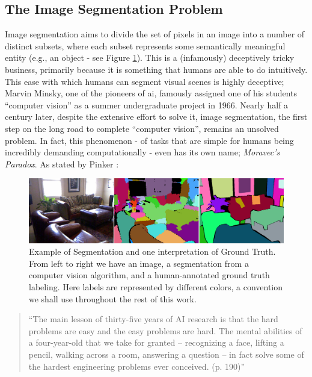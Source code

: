 \subsection{The Image Segmentation Problem}
Image segmentation aims to divide the set of pixels in an image into a number of distinct subsets, where each subset represents some semantically meaningful entity (e.g., an object - see Figure \ref{ExampleSeg}). This is a (infamously) deceptively tricky business, primarily because it is something that humans are able to do intuitively. This ease with which humans can segment visual scenes is highly deceptive; Marvin Minsky, one of the pioneers of \gls{ai}, famously assigned one of his students ``computer vision'' as a summer undergraduate project in 1966. Nearly half a century later, despite the extensive effort to solve it, image segmentation, the first step on the long road to complete ``computer vision'', remains an unsolved problem.  In fact, this phenomenon - of tasks that are simple for humans being incredibly demanding computationally - even has its own name; \emph{Moravec's Paradox}. As stated by Pinker \cite{Pinker_Language}:

\begin{figure}[!t]
\includegraphics[width=\linewidth]{figures/Introduction/segmentation_GT_example.png}
\caption[Example of Segmentation and Ground Truth]{Example of Segmentation and one interpretation of Ground Truth. From left to right we have an image, a segmentation from a computer vision algorithm, and a human-annotated ground truth labeling. Here labels are represented by different colors, a convention we shall use throughout the rest of this work.}
\label{ExampleSeg}
\end{figure}

\begin{quote}
``The main lesson of thirty-five years of AI research is that the hard problems are easy and the easy problems are hard. The mental abilities of a four-year-old that we take for granted – recognizing a face, lifting a pencil, walking across a room, answering a question – in fact solve some of the hardest engineering problems ever conceived. (p. 190)''
\end{quote}


